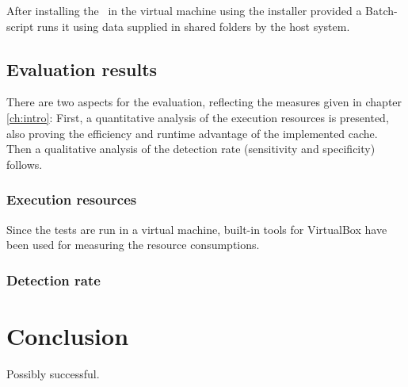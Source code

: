 After installing the \vd~in the virtual machine using the installer provided a Batch-script runs it using data supplied in shared folders by the host system.

\section{Evaluation results}\label{sec:eval-results}

There are two aspects for the evaluation, reflecting the measures given in chapter \ref{ch:intro}: First, a quantitative analysis of the execution resources is presented, also proving the efficiency and runtime advantage of the implemented cache. Then a qualitative analysis of the detection rate (sensitivity and specificity) follows.

\subsection{Execution resources}

Since the tests are run in a virtual machine, built-in tools for VirtualBox have been used for measuring the resource consumptions.

\subsection{Detection rate}

\chapter{Conclusion}\label{ch:conclusion}

Possibly successful.
